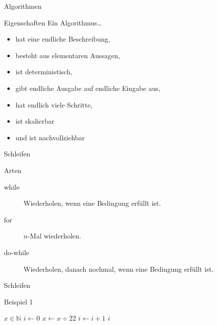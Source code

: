 \begin{frame}{Algorithmen}
    \begin{block}{Eigenschaften}
        Ein Algorithmus\dots
        \begin{itemize}
            \item hat eine endliche Beschreibung, 
                \pause
            \item besteht aus elementaren Aussagen,
                \pause
            \item ist deterministisch,
                \pause
            \item gibt endliche Ausgabe auf endliche Eingabe aus,
                \pause
            \item hat endlich viele Schritte,
                \pause
            \item ist skalierbar
                \pause
            \item und ist nachvollziehbar
        \end{itemize}
    \end{block}
\end{frame}

\begin{frame}{Schleifen}
    \begin{block}{Arten}
        \begin{description}
            \item[while] Wiederholen, wenn eine Bedingung erfüllt ist.
                \pause
            \item[for] $n$-Mal wiederholen.
                \pause
            \item[do-while] Wiederholen, danach nochmal, wenn eine Bedingung erfüllt ist.
        \end{description}
    \end{block}
\end{frame}

\begin{frame}{Schleifen}
    \begin{exampleblock}{Beispiel 1}
        \begin{algorithm}
            \begin{algorithmic}
                \Require $x \in \mathbb{N}$
                \State $i \gets 0$
                    \State $x\gets x \div2 2$
                    \State $i\gets i + 1$
                \EndWhile
                \Ensure $i$
            \end{algorithmic}
        \end{algorithm}
    \end{exampleblock}
\end{frame}


